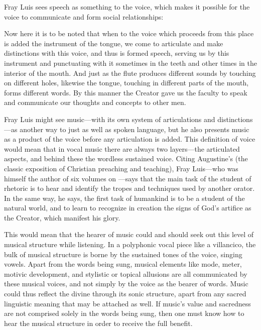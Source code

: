 Fray Luis sees speech as something  to the voice, which makes it
possible for the voice to communicate and form social relationships:
\begin{quoting} 
    Now here it is to be noted that when to the voice which proceeds from this
    place is added the instrument of the tongue, we come to articulate and make
    distinctions with this voice, and thus is formed speech, serving us by this
    instrument and punctuating  with it sometimes in the
    teeth and other times in the interior of the mouth.
    And just as the flute produces different sounds by touching on different
    holes, likewise the tongue, touching in different parts of the mouth, forms
    different words.  
    By this manner the Creator gave us the faculty to speak and communicate our
    thoughts and concepts to other men.%
        \Autocite[252]{LuisdeGranada:Simbolo}
\end{quoting}
Fray Luis might see music---with its own system of articulations and
distinctions---as another way to 
just as well as spoken language, but he also presents music as a product of the
voice before any articulation is added.
This definition of voice would mean that in vocal music there are always two
layers---the articulated  aspects, and behind these the wordless
sustained voice.
Citing Augustine's  (the classic exposition of
Christian preaching and teaching), Fray Luis---who was himself the author of
six volumes on ---says that the main task of
the student of rhetoric is to hear and identify the tropes and techniques used
by another orator.
In the same way, he says, the first task of humankind is to be a student of the
natural world, and to learn to recognize in creation the signs of God's
artifice as the Creator, which manifest his glory.


This would mean that the hearer of music could and should seek out this level
of musical structure while listening.
In a polyphonic vocal piece like a villancico, the bulk of musical structure is
borne by the sustained tones of the voice, singing vowels.
Apart from the words being sung, musical elements like mode, meter, motivic
development, and stylistic or topical allusions are all communicated by these
musical voices, and not simply by the voice as the bearer of words.
Music could thus reflect the divine through its sonic structure, apart from any
sacred linguistic meaning that may be attached as well.
If music's value and sacredness are not comprised solely in the words being
sung, then one must know how to hear the musical structure in order to receive
the full benefit.

